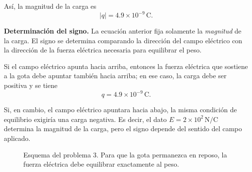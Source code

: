 \documentclass[11pt]{article}
\begin{document}
Así, la magnitud de la carga es
\begin{equation*}
\boxed{|q|=4.9\times 10^{-9}\,\mathrm{C}.}
\end{equation*}

\textbf{Determinación del signo.} La ecuación anterior fija solamente la \emph{magnitud} de la carga. El signo se determina comparando la dirección del campo eléctrico con la dirección de la fuerza eléctrica necesaria para equilibrar el peso.

Si el campo eléctrico apunta hacia arriba, entonces la fuerza eléctrica que sostiene a la gota debe apuntar también hacia arriba; en ese caso, la carga debe ser positiva y se tiene
\begin{equation*}
\boxed{q=4.9\times 10^{-9}\,\mathrm{C}.}
\end{equation*}

Si, en cambio, el campo eléctrico apuntara hacia abajo, la misma condición de equilibrio exigiría una carga negativa. Es decir, el dato $E=2\times 10^2\,\mathrm{N/C}$ determina la magnitud de la carga, pero el signo depende del sentido del campo aplicado.

\begin{figure}[h!]
\centering
{}
\caption{Esquema del problema 3. Para que la gota permanezca en reposo, la fuerza eléctrica debe equilibrar exactamente al peso.}
\end{figure}
\end{document}
